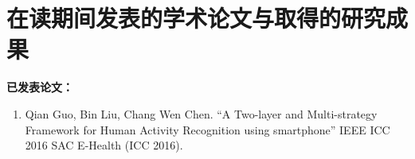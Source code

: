 ﻿
\chapter{在读期间发表的学术论文与取得的研究成果}



\noindent\textbf{已发表论文：}

\begin{enumerate}

\item Qian Guo, Bin Liu, Chang Wen Chen. “A Two-layer and Multi-strategy Framework for Human Activity Recognition using smartphone” IEEE ICC 2016 SAC E-Health (ICC 2016).
\end{enumerate}

\vskip 1cm

